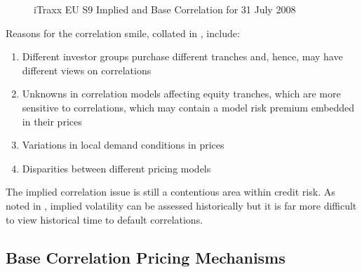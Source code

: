 \begin{figure}
\centerline{}
\caption{\label{fig:impCorr}iTraxx EU S9 Implied and Base Correlation for 31 July 2008}
\end{figure}

Reasons for the correlation smile, collated in \cite{Eli2006}, include:
\begin{enumerate}
\item Different investor groups purchase different tranches and, hence, may have different views on correlations
\item Unknowns in correlation models affecting equity tranches, which are more sensitive to correlations, which may contain a model risk premium embedded in their prices
\item Variations in local demand conditions in prices
\item Disparities between different pricing models
\end{enumerate}

The implied correlation issue is still a contentious area within credit risk.  As noted in \cite{risk2006}, implied volatility can be assessed historically but it is far more difficult to view historical time to default correlations.

\subsection{Base Correlation Pricing Mechanisms}

